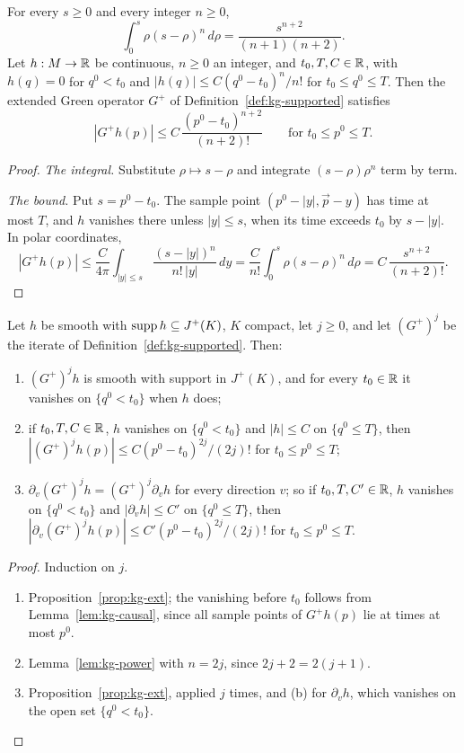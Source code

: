 \begin{lemma}\label{lem:kg-power}
For every $s\ge0$ and every integer $n\ge0$,
\[
\int_0^s\rho(s-\rho)^n\,d\rho=\frac{s^{n+2}}{(n+1)(n+2)}.
\]
Let $h:M\to\mathbb R$ be continuous, $n\ge0$ an integer, and $t_0,T,C\in\mathbb R$, with $h(q)=0$ for $q^0<t_0$
and $|h(q)|\le C(q^0-t_0)^n/n!$ for $t_0\le q^0\le T$. Then the extended Green operator $G^+$ of
Definition~\ref{def:kg-supported} satisfies
\[
|G^+h(p)|\le C\,\frac{(p^0-t_0)^{n+2}}{(n+2)!}\qquad\text{for }t_0\le p^0\le T.
\]
\end{lemma}
\begin{proof}
\emph{The integral.} Substitute $\rho\mapsto s-\rho$ and integrate $(s-\rho)\rho^n$ term by term.

\emph{The bound.} Put $s=p^0-t_0$. The sample point $(p^0-|y|,\vec p-y)$ has time at most $T$, and
$h$ vanishes there unless $|y|\le s$, when its time exceeds $t_0$ by $s-|y|$. In polar coordinates,
\[
|G^+h(p)|\le\frac C{4\pi}\int_{|y|\le s}\frac{(s-|y|)^n}{n!\,|y|}\,dy
=\frac C{n!}\int_0^s\rho(s-\rho)^n\,d\rho=C\,\frac{s^{n+2}}{(n+2)!}.
\]
\end{proof}

\begin{corollary}[Iterates]\label{cor:kg-iterate}
Let $h$ be smooth with $\operatorname{supp} h\subseteq J^+(K)$, $K$ compact, let $j\ge0$, and let $(G^+)^j$ be the
iterate of Definition~\ref{def:kg-supported}. Then:
\begin{enumerate}[label=(\alph*),leftmargin=2.5em]
\item $(G^+)^jh$ is smooth with support in $J^+(K)$, and for every $t_0\in\mathbb R$ it vanishes on
$\{q^0<t_0\}$ when $h$ does;
\item if $t_0,T,C\in\mathbb R$, $h$ vanishes on $\{q^0<t_0\}$ and $|h|\le C$ on $\{q^0\le T\}$, then
$|(G^+)^jh(p)|\le C(p^0-t_0)^{2j}/(2j)!$ for $t_0\le p^0\le T$;
\item $\partial_v(G^+)^jh=(G^+)^j\partial_vh$ for every direction $v$; so if $t_0,T,C'\in\mathbb R$, $h$
vanishes on $\{q^0<t_0\}$ and $|\partial_vh|\le C'$ on $\{q^0\le T\}$, then
$|\partial_v(G^+)^jh(p)|\le C'(p^0-t_0)^{2j}/(2j)!$ for $t_0\le p^0\le T$.
\end{enumerate}
\end{corollary}
\begin{proof}
Induction on $j$.
\begin{enumerate}[leftmargin=2.5em]
\item[(a)] Proposition~\ref{prop:kg-ext}; the vanishing before $t_0$ follows from
Lemma~\ref{lem:kg-causal}, since all sample points of $G^+h(p)$ lie at times at most $p^0$.
\item[(b)] Lemma~\ref{lem:kg-power} with $n=2j$, since $2j+2=2(j+1)$.
\item[(c)] Proposition~\ref{prop:kg-ext}, applied $j$ times, and (b) for $\partial_vh$, which
vanishes on the open set $\{q^0<t_0\}$.
\end{enumerate}
\end{proof}

